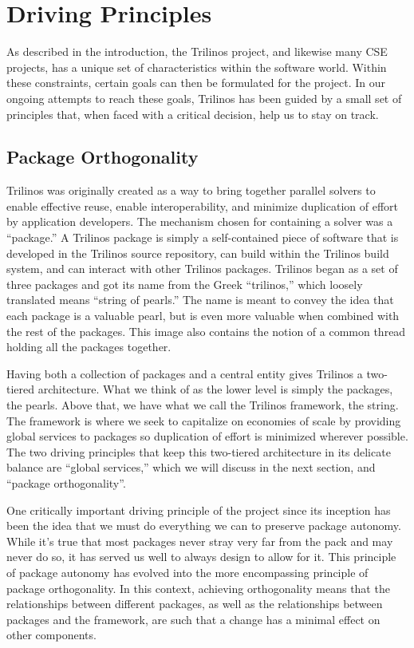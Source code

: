\documentclass[12pt,relax]{article}
\begin{document}
\section{Driving Principles}
\label{Section:Driving Principles}

As described in the introduction, the Trilinos project, and likewise many CSE
projects, has a unique set of characteristics within the software world.
Within these constraints, certain goals can then be formulated for the project.
In our ongoing attempts to reach these goals, Trilinos has been guided by a
small set of principles that, when faced with a critical decision, help us to
stay on track.

\subsection{Package Orthogonality}

Trilinos was originally created as a way to bring together parallel solvers
to enable effective reuse, enable interoperability, and minimize duplication of
effort by application developers.  The mechanism chosen for containing a solver
was a ``package.''  A Trilinos package is simply a self-contained piece of
software that is developed in the Trilinos source repository, can build within
the Trilinos build system, and can interact with other Trilinos packages.
Trilinos began as a set of three packages and got its name from the Greek 
``trilinos,'' which loosely translated means ``string of pearls.''  The name is
meant to convey the idea that each package is a valuable pearl, but is even
more valuable when combined with the rest of the packages.  This image also
contains the notion of a common thread holding all the packages together.

Having both a collection of packages and a central entity gives Trilinos a
two-tiered architecture.  What we think of as the lower level is simply the
packages, the pearls.  Above that, we have what we call the Trilinos framework,
the string.  The framework is where we seek to capitalize on economies of scale
by providing global services to packages so duplication of effort is minimized
wherever possible.  The two driving principles that keep this two-tiered
architecture in its delicate balance are ``global services,'' which we will
discuss in the next section, and ``package orthogonality''.

One critically important driving principle of the project since its inception
has been the idea that we must do everything we can to preserve package
autonomy.  While it's true that most packages never stray very far from the
pack and may never do so, it has served us well to always design to allow for
it.  This principle of package autonomy has evolved into the more
encompassing principle of package orthogonality.   In this context, 
achieving orthogonality means that the 
relationships between different packages, as well as the relationships
between packages and the framework, are such that a change has
a minimal effect on other components.
\end{document}
